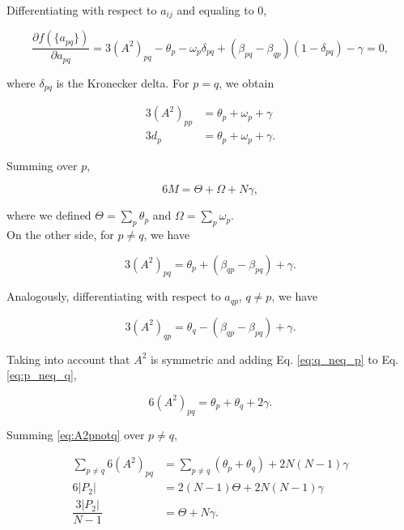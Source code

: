 \documentclass{article}
\begin{document}
Differentiating with respect to $a_{ij}$ and equaling to 0,

\begin{equation}
    \dfrac{\partial f(\lbrace a_{pq} \rbrace)}{\partial a_{pq}} = 3 (A^2)_{pq} - \theta_p - \omega_p \delta_{pq} + (\beta_{pq} - \beta_{qp}) (1-\delta_{pq}) - \gamma = 0,
\end{equation}

where $\delta_{pq}$ is the Kronecker delta. For $p=q$, we obtain

\begin{align}
    3 (A^2)_{pp} &= \theta_p + \omega_p + \gamma \\
    3 d_p &=  \theta_p + \omega_p + \gamma.
\end{align}

Summing over $p$,

\begin{equation} \label{eq:diagonal}
    6 M = \Theta + \Omega + N \gamma,
\end{equation}

where we defined $\Theta = \sum_p \theta_p$ and $\Omega = \sum_p \omega_p$.
\\

On the other side, for $p\neq q$, we have

\begin{equation} \label{eq:p_neq_q}
    3 (A^2)_{pq} = \theta_p + (\beta_{qp} - \beta_{pq}) + \gamma.
\end{equation}

Analogously, differentiating with respect to $a_{qp}$, $q \neq p$, we have

\begin{equation}\label{eq:q_neq_p}
    3 (A^2)_{qp} = \theta_q - (\beta_{qp} - \beta_{pq}) + \gamma.
\end{equation}

Taking into account that $A^2$ is symmetric and adding Eq. \ref{eq:q_neq_p} to Eq. \ref{eq:p_neq_q}, 

\begin{equation} \label{eq:A2pnotq}
    6 (A^2)_{pq} = \theta_p + \theta_q + 2 \gamma.
\end{equation} 



Summing \ref{eq:A2pnotq} over $p\neq q$,

\begin{align}
    \sum_{p\neq q}6 (A^2)_{pq} &=\sum_{p\neq q} (\theta_p + \theta_q) +2 N(N-1) \gamma \nonumber \\
    6 |P_2| &= 2(N-1) \Theta + 2N(N-1) \gamma \nonumber \\
    \dfrac{3 |P_2|}{N-1} &= \Theta + N \gamma. \label{eq:sum_mu}
\end{align}
\end{document}
